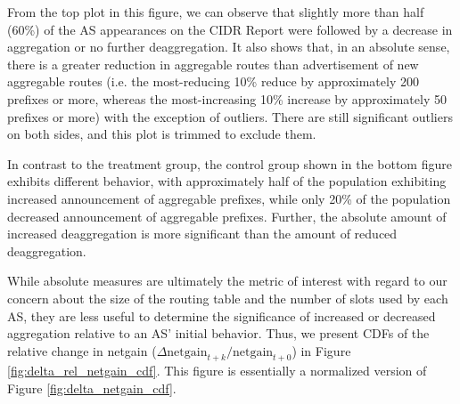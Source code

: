 From the top plot in this figure, we can observe that slightly more than half
(60\%) of the AS appearances on the CIDR Report were followed by a decrease in
aggregation or no further deaggregation. It also shows that, in an absolute
sense, there is a greater reduction in aggregable routes than advertisement of
new aggregable routes (i.e. the most-reducing 10\% reduce by approximately 200
prefixes or more, whereas the most-increasing 10\% increase by approximately 50
prefixes or more) with the exception of outliers. There are still significant
outliers on both sides, and this plot is trimmed to exclude them.

In contrast to the treatment group, the control group shown in the bottom
figure exhibits different behavior, with approximately half of the population
exhibiting increased announcement of aggregable prefixes, while only 20\% of
the population decreased announcement of aggregable prefixes. Further, the
absolute amount of increased deaggregation is more significant than the amount
of reduced deaggregation.

While absolute measures are ultimately the metric of interest with regard to
our concern about the size of the routing table and the number of slots used by
each AS, they are less useful to determine the significance of increased or
decreased aggregation relative to an AS' initial behavior. Thus, we present
CDFs of the relative change in netgain
($\Delta\textrm{netgain}_{t+k}/\textrm{netgain}_{t+0}$) in Figure
\ref{fig:delta_rel_netgain_cdf}. This figure is essentially a normalized
version of Figure \ref{fig:delta_netgain_cdf}.

